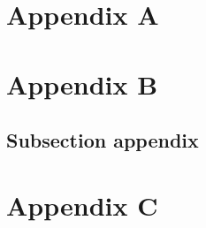 \begin{spacing}{1}
\RaggedRight
























\begin{appendices}
        \chapter{Appendix A}
        
        
        \chapter{Appendix B}
        \section{Subsection appendix}
        
        \chapter{Appendix C}
        
\end{appendices}



\end{spacing}
